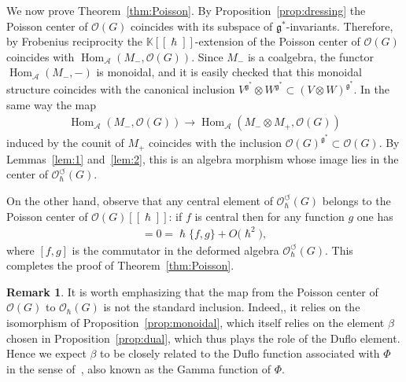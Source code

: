 \documentclass[10pt,a4paper]{amsart}
\numberwithin{equation}{section}
\newcommand{\ca}{\circlearrowleft}
\newcommand{\mf}[1]{\mathfrak{#1}}
\newcommand{\h}{\hslash}
\newcommand{\ot}{\otimes}
\newcommand{\cO}{\mathcal O}
\newcommand{\cA}{\mathcal {A}}
\newcommand{\kk}{\mathbb K}
\renewcommand{\hom}{\operatorname{Hom}}
\theoremstyle{definition}
\newtheorem{rmk}[thm]{Remark}
\begin{document}
We now prove Theorem~\ref{thm:Poisson}. By Proposition~\ref{prop:dressing} the Poisson center of $\cO(G)$ coincides with its subspace of $\mf g^*$-invariants. Therefore, by Frobenius reciprocity the $\kk[[\h]]$-extension of the Poisson center of $\cO(G)$ coincides with $\hom_\cA(M_-,\cO(G))$. Since $M_-$ is a coalgebra, the functor $\hom_\cA(M_-,-)$ is monoidal, and it is easily checked that this monoidal structure coincides with the canonical inclusion $V^{\mf g^*}\ot W^{\mf g^*}\subset (V\ot W)^{\mf g^*}$. In the same way the map
\begin{gather*}
	\hom_\cA(M_-,\cO(G))\rightarrow \hom_\cA(M_- \ot M_+,\cO(G))
\end{gather*}
induced by the counit of $M_+$ coincides with the inclusion $\cO(G)^{\mf g^*} \subset \cO(G)$. By Lemmas~\ref{lem:1} and~\ref{lem:2}, this is an algebra morphism whose image lies in the center of $\cO_\h^\ca(G)$.

	On the other hand, observe that any central element of $\cO_\h^\ca(G)$ belongs to the Poisson center of $\cO(G)[[\h]]$: if $f$ is central then for any function $g$ one has
	\begin{gather*}
		[f,g]=0=\h\{f,g\}+O\big(\h^2\big),
	\end{gather*}
	where $[f,g]$ is the commutator in the deformed algebra $\cO_\h^\ca(G)$. This completes the proof of Theorem~\ref{thm:Poisson}.

	\begin{rmk}\label{rmk:gamma}
		It is worth emphasizing that the map from the Poisson center of $\cO(G)$ to $\cO_\h(G)$ is not the standard inclusion. Indeed,, it relies on the isomorphism of Proposition~\ref{prop:monoidal}, which itself relies on the element $\beta$ chosen in Proposition~\ref{prop:dual}, which thus plays the role of the Duf\/lo element. Hence we expect $\beta$ to be closely related to the Duf\/lo function associated with $\Phi$ in the sense of~\cite{Alekseev2010}, also known as the Gamma function of $\Phi$.
	\end{rmk}
\end{document}
